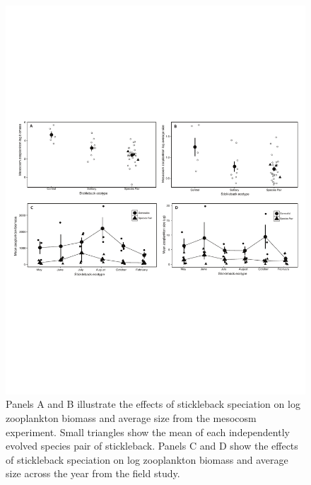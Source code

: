 \documentclass[11pt]{article}
\begin{document}
\begin{figure}[ht]
\includegraphics[trim=1cm 8cm 1cm 8cm, scale=0.8]{repeat_Fig1_161109.pdf}
\caption{Panels A and B illustrate the effects of stickleback speciation on log zooplankton biomass and average size from the mesocosm experiment.  Small triangles show the mean of each independently evolved species pair of stickleback.  Panels C and D show the effects of stickleback speciation on log zooplankton biomass and average size across the year from the field study.}
\label{Fig:Zoop}
\end{figure}

\newpage
\end{document}
